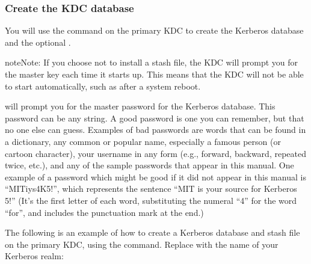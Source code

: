 \documentclass[letterpaper,10pt,english]{sphinxmanual}
\begin{document}
\subsubsection{Create the KDC database}
\label{\detokenize{admin/install_kdc:create-the-kdc-database}}\label{\detokenize{admin/install_kdc:create-db}}
You will use the {\hyperref[\detokenize{admin/admin_commands/kdb5_util:kdb5-util-8}]{}} command on the primary KDC to
create the Kerberos database and the optional .

\begin{sphinxadmonition}{note}{Note:}
If you choose not to install a stash file, the KDC will
prompt you for the master key each time it starts up.  This
means that the KDC will not be able to start automatically,
such as after a system reboot.
\end{sphinxadmonition}

{\hyperref[\detokenize{admin/admin_commands/kdb5_util:kdb5-util-8}]{}} will prompt you for the master password for the
Kerberos database.  This password can be any string.  A good password
is one you can remember, but that no one else can guess.  Examples of
bad passwords are words that can be found in a dictionary, any common
or popular name, especially a famous person (or cartoon character),
your username in any form (e.g., forward, backward, repeated twice,
etc.), and any of the sample passwords that appear in this manual.
One example of a password which might be good if it did not appear in
this manual is “MITiys4K5!”, which represents the sentence “MIT is
your source for Kerberos 5!”  (It’s the first letter of each word,
substituting the numeral “4” for the word “for”, and includes the
punctuation mark at the end.)

The following is an example of how to create a Kerberos database and
stash file on the primary KDC, using the {\hyperref[\detokenize{admin/admin_commands/kdb5_util:kdb5-util-8}]{}} command.
Replace  with the name of your Kerberos realm:
\end{document}
